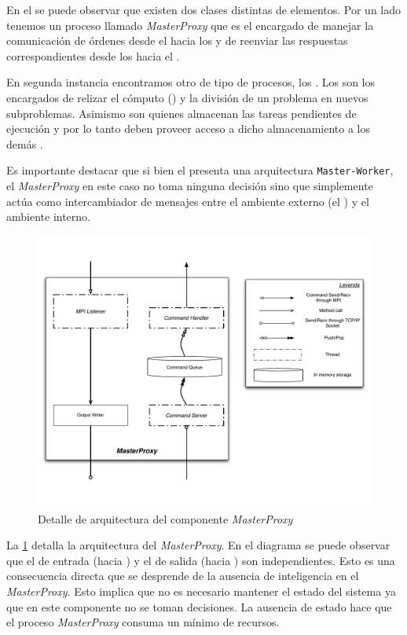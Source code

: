 \newcommand{\master}{\emph{MasterProxy}\xspace}

En el \bend se puede observar que existen dos clases distintas de elementos.
Por un lado tenemos un proceso llamado \master que es el encargado de manejar
la comunicación de órdenes desde el \fend hacia los \ws y de reenviar las
respuestas correspondientes desde los \ws hacia el \fend.

En segunda instancia encontramos otro de tipo de procesos, los \ws. Los \ws
son los encargados de relizar el cómputo (\ssolving) y la división de un
problema en nuevos subproblemas. Asimismo son quienes almacenan las tareas
pendientes de ejecución y por lo tanto deben proveer acceso a dicho
almacenamiento a los demás \ws.

\newcommand{\masterslave}{\texttt{Master-Worker}\xspace}

Es importante destacar que si bien el \bend presenta una arquitectura
\masterslave, el \master en este caso no toma ninguna decisión sino que
simplemente actúa como intercambiador de mensajes entre el ambiente externo
(el \fend) y el ambiente interno.

\begin{figure}
\centering
\includegraphics[scale=0.3]{graphs/master proxy detail}
\caption{Detalle de arquitectura del componente \master}
\label{fig:masterproxydetail}
\end{figure}

La \fig\ref{fig:masterproxydetail} detalla la arquitectura del \master. En el
diagrama se puede observar que el \datapath de entrada (\fend hacia \bend) y
el de salida (\bend hacia \fend) son independientes. Esto es una consecuencia
directa que se desprende de la ausencia de inteligencia en el \master. Esto
implica que no es necesario mantener el estado del sistema ya que en este
componente no se toman decisiones. La ausencia de estado hace que el proceso
\master consuma un mínimo de recursos.

